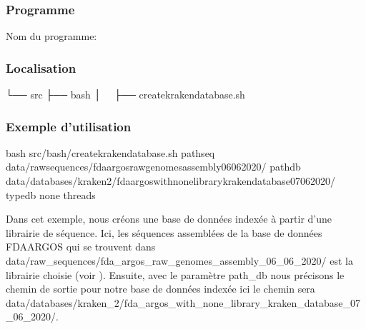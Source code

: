 \documentclass[letterpaper,10pt,french]{sphinxmanual}
\begin{document}
\subsubsection{Programme}
\label{\detokenize{tutorial:id19}}
Nom du programme:

\begin{sphinxVerbatim}[commandchars=\\\{\}]
\end{sphinxVerbatim}


\subsubsection{Localisation}
\label{\detokenize{tutorial:id20}}
\begin{sphinxVerbatim}[commandchars=\\\{\}]
└── src
 ├── bash
 │   ├── create\PYGZus{}kraken\PYGZus{}database.sh
\end{sphinxVerbatim}


\subsubsection{Exemple d’utilisation}
\label{\detokenize{tutorial:id21}}
\begin{sphinxVerbatim}[commandchars=\\\{\}]
bash src/bash/create\PYGZus{}kraken\PYGZus{}database.sh 
             \PYGZhy{}path\PYGZus{}seq data/raw\PYGZus{}sequences/fda\PYGZus{}argos\PYGZus{}raw\PYGZus{}genomes\PYGZus{}assembly\PYGZus{}06\PYGZus{}06\PYGZus{}2020/ 
             \PYGZhy{}path\PYGZus{}db data/databases/kraken\PYGZus{}2/fda\PYGZus{}argos\PYGZus{}with\PYGZus{}none\PYGZus{}library\PYGZus{}kraken\PYGZus{}database\PYGZus{}07\PYGZus{}06\PYGZus{}2020/ 
             \PYGZhy{}type\PYGZus{}db none 
             \PYGZhy{}threads 
\end{sphinxVerbatim}

Dans cet exemple, nous créons une base de données indexée à partir d’une librairie de séquence. Ici, les séquences assemblées de la base de données FDA\sphinxhyphen{}ARGOS qui se trouvent dans data/raw\_sequences/fda\_argos\_raw\_genomes\_assembly\_06\_06\_2020/ est la librairie choisie (voir {\hyperref[\detokenize{tutorial:download-fda-argos}]{}}). Ensuite, avec le paramètre \sphinxhyphen{}path\_db nous précisons le chemin de sortie pour notre base de données indexée ici le chemin sera data/databases/kraken\_2/fda\_argos\_with\_none\_library\_kraken\_database\_07\_06\_2020/.
\end{document}
